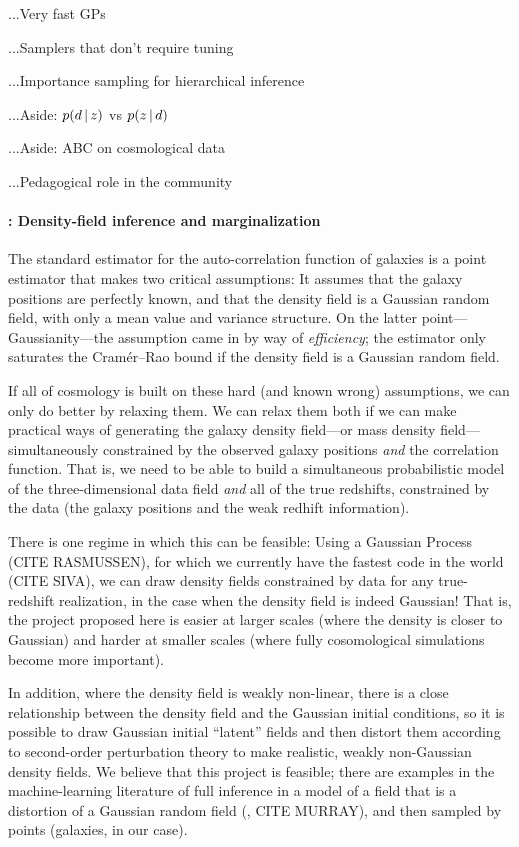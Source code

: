 \documentclass[12pt]{article}
\begin{document}
...Very fast GPs

...Samplers that don't require tuning

...Importance sampling for hierarchical inference

...Aside:  $p(d\,|\, z)$ vs $p(z\,|\, d)$

...Aside:  ABC on cosmological data

...Pedagogical role in the community

\paragraph{: Density-field inference and marginalization}

The standard estimator for the auto-correlation function of galaxies
is a point estimator that makes two critical assumptions:
It assumes that the galaxy positions are perfectly known, and that the
density field is a Gaussian random field, with only a mean value and
variance structure.
On the latter point---Gaussianity---the assumption came in by way of
\emph{efficiency}; the estimator only saturates the Cram\'er--Rao
bound if the density field is a Gaussian random field.

If all of cosmology is built on these hard (and known wrong)
assumptions, we can only do better by relaxing them.
We can relax them both if we can make practical ways of generating the
galaxy density field---or mass density field---simultaneously
constrained by the observed galaxy positions \emph{and} the
correlation function.
That is, we need to be able to build a simultaneous probabilistic
model of the three-dimensional data field \emph{and} all of the true
redshifts, constrained by the data (the galaxy positions and the weak
redhift information).

There is one regime in which this can be feasible:
Using a Gaussian Process (CITE RASMUSSEN), for which we currently have
the fastest code in the world (CITE SIVA), we can draw density fields
constrained by data for any true-redshift realization, in the case
when the density field is indeed Gaussian!
That is, the project proposed here is easier at larger scales (where
the density is closer to Gaussian) and harder at smaller scales (where
fully cosomological simulations become more important).

In addition, where the density field is weakly non-linear, there is a close
relationship between the density field and the Gaussian initial
conditions, so it is possible to draw Gaussian initial ``latent''
fields and then distort them according to second-order perturbation
theory to make realistic, weakly non-Gaussian density fields.
We believe that this project is feasible; there are examples in
the machine-learning literature of full inference in a model of a
field that is a distortion of a Gaussian random field (\eg, CITE MURRAY), and then
sampled by points (galaxies, in our case).
\end{document}
